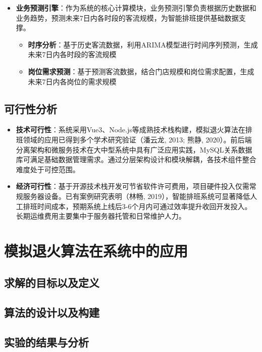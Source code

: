 \documentclass{ctexart}
\begin{document}
\begin{itemize}
    \item \textbf{业务预测引擎}：作为系统的核心计算模块，业务预测引擎负责根据历史数据和业务趋势，预测未来7日内各时段的客流规模，为智能排班提供基础数据支撑。
        \begin{itemize}
            \item \textbf{时序分析}：基于历史客流数据，利用ARIMA模型进行时间序列预测，生成未来7日内各时段的客流规模
            \item \textbf{岗位需求预测}：基于预测客流数据，结合门店规模和岗位需求配置，生成未来7日内各岗位的需求规模
        \end{itemize}
    
\end{itemize}

\subsection{可行性分析}
\begin{itemize}
    \item \textbf{技术可行性}：系统采用Vue3、Node.js等成熟技术栈构建，模拟退火算法在排班领域的应用已得到多个学术研究验证（潘云龙, 2013; 熊静, 2020）。前后端分离架构和微服务技术在大中型系统中具有广泛应用实践，MySQL关系数据库可满足基础数据管理需求。通过分层架构设计和模块解耦，各技术组件整合难度处于可控范围。

    \item \textbf{经济可行性}：基于开源技术栈开发可节省软件许可费用，项目硬件投入仅需常规服务器设备。已有案例研究表明（林畅, 2019），智能排班系统可显著降低人工排班时间成本，预期系统上线后3-6个月内可通过效率提升收回开发投入。长期运维费用主要集中于服务器托管和日常维护人力。
\end{itemize}




\section{模拟退火算法在系统中的应用}
\subsection{求解的目标以及定义}
\subsection{算法的设计以及构建}
\subsection{实验的结果与分析}
\end{document}
